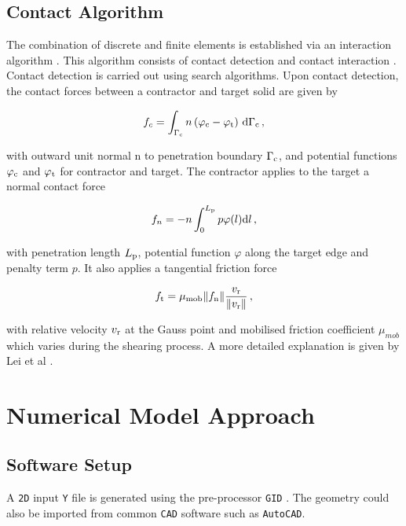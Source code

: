\documentclass[12pt,twoside]{article}
\theoremstyle{break}
\begin{document}
\subsection{Contact Algorithm}

The combination of discrete and finite elements is established via an interaction algorithm \cite{Lei16}. This algorithm consists of contact detection \cite{Che15} and contact interaction \cite{Mun13}. Contact detection is carried out using search algorithms. Upon contact detection, the contact forces between a contractor and target solid are given by

\begin{equation}
    f_c=\int_{\Gamma_{\rm{c}}}n\left(\varphi_{\rm{c}}-\varphi_{\rm{t}}\right)\,{\rm{d}}\Gamma_{\rm{c}}\,,
\end{equation}

with outward unit normal n to penetration boundary $\Gamma_{\rm{c}}$, and potential functions $\varphi_{\rm{c}}$ and $\varphi_{\rm{t}}$ for contractor and target. The contractor applies to the target a normal contact force

\begin{equation}
    f_n=-n\int_0^{L_{\rm{p}}} p\varphi(l){\rm{d}}l\,,
\end{equation}

with penetration length $L_{\rm{p}}$, potential function $\varphi$ along the target edge and penalty term $p$. It also applies a tangential friction force 

\begin{equation}
    f_{\rm{t}}=\mu_{\rm{mob}}\lVert f_{\rm{n}} \rVert\frac{v_{\rm{r}}}{\lVert v_{\rm{r}}\rVert}\,,
\end{equation}

with relative velocity $v_{\rm{r}}$ at the Gauss point and mobilised friction coefficient $\mu_{mob}$ which varies during the shearing process. A more detailed explanation is given by Lei et al \cite{Lei16}.

\section{Numerical Model Approach}
\label{sec:NumericalModelApproach}

\subsection{Software Setup}
\label{subsec:SoftwareSetup}

A \texttt{2D} input \texttt{Y} file is generated using the pre-processor \texttt{GID} \cite{GID11}. The geometry could also be imported from common \texttt{CAD} software such as \texttt{AutoCAD}.
\end{document}
